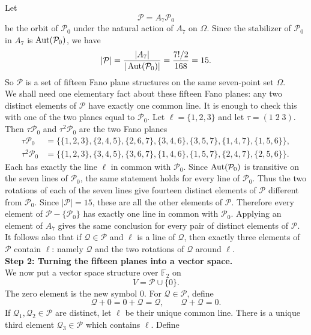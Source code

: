 \documentclass[../Odyssey_Project.tex]{subfiles}
\begin{document}
\begin{solution}
Let
\[
    \mathcal P=A_7\mathcal P_0
\]
be the orbit of $\mathcal P_0$ under the natural action of $A_7$ on $\Omega$. Since the stabilizer of $\mathcal P_0$ in $A_7$ is $\operatorname{Aut}(\mathcal P_0)$, we have
\[
    |\mathcal P|
    =
    \frac{|A_7|}{|\operatorname{Aut}(\mathcal P_0)|}
    =
    \frac{7!/2}{168}
    =
    15.
\]
So $\mathcal P$ is a set of fifteen Fano plane structures on the same seven-point set $\Omega$.\\
We shall need one elementary fact about these fifteen Fano planes: any two distinct elements of $\mathcal P$ have exactly one common line. It is enough to check this with one of the two planes equal to $\mathcal P_0$. Let $\ell=\{1,2,3\}$ and let $\tau=(1\;2\;3)$. Then $\tau\mathcal P_0$ and $\tau^2\mathcal P_0$ are the two Fano planes
\[
\begin{aligned}
    \tau\mathcal P_0
    &=
    \{\{1,2,3\},\{2,4,5\},\{2,6,7\},\{3,4,6\},\{3,5,7\},\{1,4,7\},\{1,5,6\}\},\\
    \tau^2\mathcal P_0
    &=
    \{\{1,2,3\},\{3,4,5\},\{3,6,7\},\{1,4,6\},\{1,5,7\},\{2,4,7\},\{2,5,6\}\}.
\end{aligned}
\]
Each has exactly the line $\ell$ in common with $\mathcal P_0$. Since $\operatorname{Aut}(\mathcal P_0)$ is transitive on the seven lines of $\mathcal P_0$, the same statement holds for every line of $\mathcal P_0$. Thus the two rotations of each of the seven lines give fourteen distinct elements of $\mathcal P$ different from $\mathcal P_0$. Since $|\mathcal P|=15$, these are all the other elements of $\mathcal P$. Therefore every element of $\mathcal P-\{\mathcal P_0\}$ has exactly one line in common with $\mathcal P_0$. Applying an element of $A_7$ gives the same conclusion for every pair of distinct elements of $\mathcal P$.\\
It follows also that if $\mathcal Q\in\mathcal P$ and $\ell$ is a line of $\mathcal Q$, then exactly three elements of $\mathcal P$ contain $\ell$: namely $\mathcal Q$ and the two rotations of $\mathcal Q$ around $\ell$.\\
\noindent\textbf{Step 2: Turning the fifteen planes into a vector space.}\\
We now put a vector space structure over $\mathbb F_2$ on
\[
    V=\mathcal P\cup\{0\}.
\]
The zero element is the new symbol $0$. For $\mathcal Q\in\mathcal P$, define
\[
    \mathcal Q+0=0+\mathcal Q=\mathcal Q,
    \qquad
    \mathcal Q+\mathcal Q=0.
\]
If $\mathcal Q_1,\mathcal Q_2\in\mathcal P$ are distinct, let $\ell$ be their unique common line. There is a unique third element $\mathcal Q_3\in\mathcal P$ which contains $\ell$. Define

\end{solution}
\end{document}
